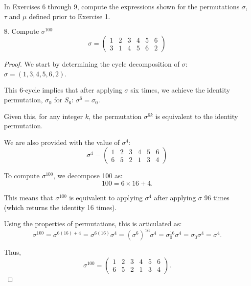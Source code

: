 \documentclass[12pt]{amsart}
\theoremstyle{definition}
\numberwithin{equation}{section}
\theoremstyle{plain}
\begin{document}
\vspace*{20pt}
\begin{exercise}{8} In Exercises 6 through 9, compute the expressions shown for the permutations $\sigma$, $\tau$ and $\mu$ defined prior to Exercise 1.

\(\text{8. Compute }\sigma^{100}\)
\[
\sigma = 
\begin{pmatrix}
1 & 2 & 3 & 4 & 5 & 6 \\
3 & 1 & 4 & 5 & 6 & 2
\end{pmatrix}
\]

\begin{proof}

We start by determining the cycle decomposition of \(\sigma\):
\(\sigma = (1, 3, 4, 5, 6, 2)\).

This 6-cycle implies that after applying \(\sigma\) six times, we achieve the identity permutation, \(\sigma_0\) for \(S_6\):
\(\sigma^6 = \sigma_0\).

Given this, for any integer \(k\), the permutation \(\sigma^{6k}\) is equivalent to the identity permutation. 

We are also provided with the value of \(\sigma^4\):
\[
\sigma^4 = 
\begin{pmatrix}
1 & 2 & 3 & 4 & 5 & 6 \\
6 & 5 & 2 & 1 & 3 & 4
\end{pmatrix}
\]

To compute \(\sigma^{100}\), we decompose 100 as:
\[100 = 6 \times 16 + 4.\]

This means that \(\sigma^{100}\) is equivalent to applying \(\sigma^4\) after applying \(\sigma\) 96 times (which returns the identity 16 times).

Using the properties of permutations, this is articulated as:
\[
\sigma^{100} = \sigma^{6(16) + 4} = \sigma^{6(16)}\sigma^4 = (\sigma^6)^{16}\sigma^4 = \sigma_0^{16}\sigma^4 = \sigma_0\sigma^4 = \sigma^4.
\]

Thus, 
\[
\sigma^{100} = 
\begin{pmatrix}
1 & 2 & 3 & 4 & 5 & 6 \\
6 & 5 & 2 & 1 & 3 & 4
\end{pmatrix}.
\]

\end{proof}
\end{exercise}
\vspace*{20pt}
\end{document}
